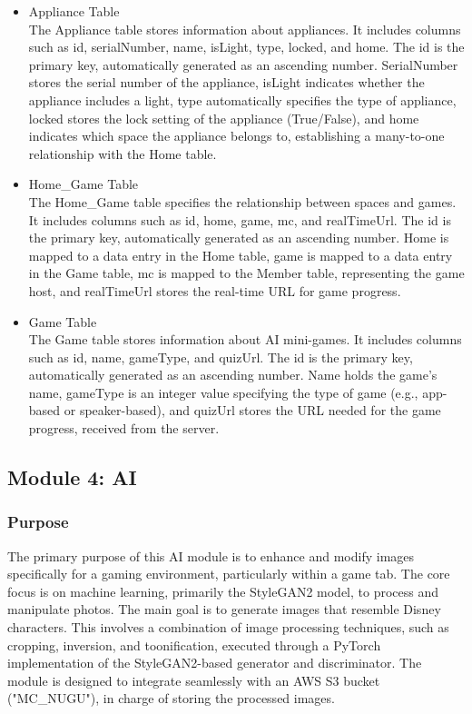 \documentclass[conference]{IEEEtran}
\begin{document}
\begin{itemize}
                \vspace{3mm}                
                \item Appliance Table\\
                The Appliance table stores information about appliances. It includes columns such as id, serialNumber, name, isLight, type, locked, and home. The id is the primary key, automatically generated as an ascending number. SerialNumber stores the serial number of the appliance, isLight indicates whether the appliance includes a light, type automatically specifies the type of appliance, locked stores the lock setting of the appliance (True/False), and home indicates which space the appliance belongs to, establishing a many-to-one relationship with the Home table.
                \vspace{3mm}                
                \item Home\_Game Table\\
                The Home\_Game table specifies the relationship between spaces and games. It includes columns such as id, home, game, mc, and realTimeUrl. The id is the primary key, automatically generated as an ascending number. Home is mapped to a data entry in the Home table, game is mapped to a data entry in the Game table, mc is mapped to the Member table, representing the game host, and realTimeUrl stores the real-time URL for game progress.
                \vspace{3mm}                
                \item Game Table\\
                The Game table stores information about AI mini-games. It includes columns such as id, name, gameType, and quizUrl. The id is the primary key, automatically generated as an ascending number. Name holds the game's name, gameType is an integer value specifying the type of game (e.g., app-based or speaker-based), and quizUrl stores the URL needed for the game progress, received from the server.
            \end{itemize}
    \subsection{Module 4: AI}
        \subsubsection{Purpose}
            The primary purpose of this AI module is to enhance and modify images specifically for a gaming environment, particularly within a game tab. The core focus is on machine learning, primarily the StyleGAN2 model, to process and manipulate photos. The main goal is to generate images that resemble Disney characters. This involves a combination of image processing techniques, such as cropping, inversion, and toonification, executed through a PyTorch implementation of the StyleGAN2-based generator and discriminator. The module is designed to integrate seamlessly with an AWS S3 bucket ("MC\_NUGU"), in charge of storing the processed images.\\
\end{document}
